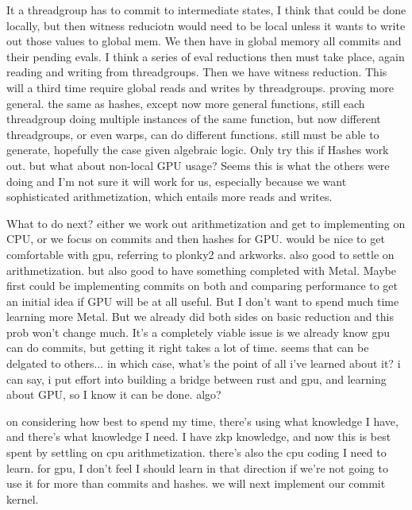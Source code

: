         It a threadgroup has to commit to intermediate states, I think that could be done locally, but then witness reduciotn would need to be local unless it wants to write out those values to global mem.
        We then have in global memory all commits and their pending evals. I think a series of eval reductions then must take place, again reading and writing from threadgroups.
        Then we have witness reduction. This will a third time require global reads and writes by threadgroups. 
    proving more general.
        the same as hashes, except now more general functions, still each threadgroup doing multiple instances of the same function, but now different threadgroups, or even warps, can do different functions. still must be able to generate, hopefully the case given algebraic logic. Only try this if Hashes work out.
but what about non-local GPU usage?
    Seems this is what the others were doing and I'm not sure it will work for us, especially because we want sophisticated arithmetization, which entails more reads and writes. 

What to do next?
    either we work out arithmetization and get to implementing on CPU, or we focus on commits and then hashes for GPU. 
    would be nice to get comfortable with gpu, referring to plonky2 and arkworks. also good to settle on arithmetization. but also good to have something completed with Metal.
    Maybe first could be implementing commits on both and comparing performance to get an initial idea if GPU will be at all useful. But I don't want to spend much time learning more Metal. But we already did both sides on basic reduction and this prob won't change much. It's a completely viable 
    issue is we already know gpu can do commits, but getting it right takes a lot of time. seems that can be delgated to others... in which case, what's the point of all i've learned about it?
    i can say, i put effort into building a bridge between rust and gpu, and learning about GPU, so I know it can be done.
    algo? 

    on considering how best to spend my time, there's using what knowledge I have, and there's what knowledge I need.
    I have zkp knowledge, and now this is best spent by settling on cpu arithmetization. there's also the cpu coding I need to learn. for gpu, I don't feel I should learn in that direction if we're not going to use it for more than commits and hashes. 
    we will next implement our commit kernel. 

